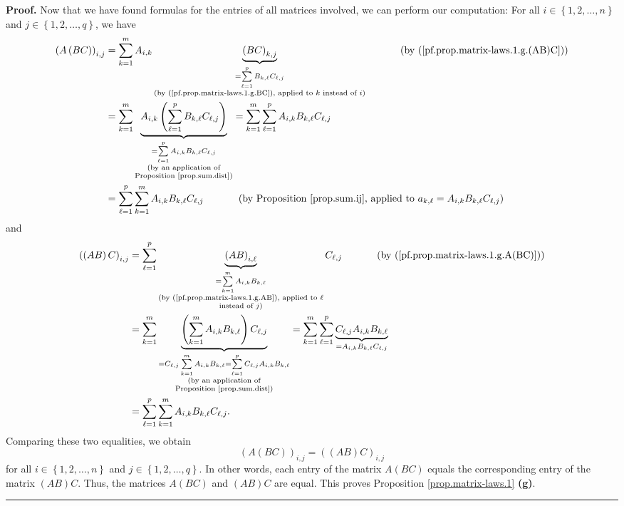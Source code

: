 \documentclass[numbers=enddot,12pt,final,onecolumn,notitlepage]{scrartcl}%
\theoremstyle{definition}
\newenvironment{proof}[1][Proof]{\noindent\textbf{#1.} }{\ \rule{0.5em}{0.5em}}
\let\sumnonlimits\sum
\renewcommand{\sum}{\sumnonlimits\limits}
\begin{document}
\begin{proof}
Now that we have found formulas for the entries of all matrices involved, we
can perform our computation: For all $i\in\left\{  1,2,\ldots,n\right\}  $ and
$j\in\left\{  1,2,\ldots,q\right\}  $, we have%
\begin{align*}
\left(  A\left(  BC\right)  \right)  _{i,j}  &  =\sum_{k=1}^{m}A_{i,k}%
\underbrace{\left(  BC\right)  _{k,j}}_{\substack{=\sum_{\ell=1}^{p}B_{k,\ell
}C_{\ell,j}\\\text{(by (\ref{pf.prop.matrix-laws.1.g.BC}), applied to }k\text{
instead of }i\text{)}}}\ \ \ \ \ \ \ \ \ \ \left(  \text{by
(\ref{pf.prop.matrix-laws.1.g.(AB)C})}\right) \\
&  =\sum_{k=1}^{m}\underbrace{A_{i,k}\left(  \sum_{\ell=1}^{p}B_{k,\ell
}C_{\ell,j}\right)  }_{\substack{=\sum_{\ell=1}^{p}A_{i,k}B_{k,\ell}C_{\ell
,j}\\\text{(by an application of}\\\text{Proposition \ref{prop.sum.dist})}%
}}=\sum_{k=1}^{m}\sum_{\ell=1}^{p}A_{i,k}B_{k,\ell}C_{\ell,j}\\
&  =\sum_{\ell=1}^{p}\sum_{k=1}^{m}A_{i,k}B_{k,\ell}C_{\ell,j}%
\ \ \ \ \ \ \ \ \ \ \left(  \text{by Proposition \ref{prop.sum.ij}, applied to
}a_{k,\ell}=A_{i,k}B_{k,\ell}C_{\ell,j}\right)
\end{align*}
and%
\begin{align*}
\left(  \left(  AB\right)  C\right)  _{i,j}  &  =\sum_{\ell=1}^{p}%
\underbrace{\left(  AB\right)  _{i,\ell}}_{\substack{=\sum_{k=1}^{m}%
A_{i,k}B_{k,\ell}\\\text{(by (\ref{pf.prop.matrix-laws.1.g.AB}), applied to
}\ell\\\text{instead of }j\text{)}}}C_{\ell,j}\ \ \ \ \ \ \ \ \ \ \left(
\text{by (\ref{pf.prop.matrix-laws.1.g.A(BC)})}\right) \\
&  =\sum_{k=1}^{m}\underbrace{\left(  \sum_{k=1}^{m}A_{i,k}B_{k,\ell}\right)
C_{\ell,j}}_{\substack{=C_{\ell,j}\sum_{k=1}^{m}A_{i,k}B_{k,\ell}=\sum
_{\ell=1}^{p}C_{\ell,j}A_{i,k}B_{k,\ell}\\\text{(by an application
of}\\\text{Proposition \ref{prop.sum.dist})}}}=\sum_{k=1}^{m}\sum_{\ell=1}%
^{p}\underbrace{C_{\ell,j}A_{i,k}B_{k,\ell}}_{=A_{i,k}B_{k,\ell}C_{\ell,j}}\\
&  =\sum_{\ell=1}^{p}\sum_{k=1}^{m}A_{i,k}B_{k,\ell}C_{\ell,j}.
\end{align*}
Comparing these two equalities, we obtain
\[
\left(  A\left(  BC\right)  \right)  _{i,j}=\left(  \left(  AB\right)
C\right)  _{i,j}%
\]
for all $i\in\left\{  1,2,\ldots,n\right\}  $ and $j\in\left\{  1,2,\ldots
,q\right\}  $. In other words, each entry of the matrix $A\left(  BC\right)  $
equals the corresponding entry of the matrix $\left(  AB\right)  C$. Thus, the
matrices $A\left(  BC\right)  $ and $\left(  AB\right)  C$ are equal. This
proves Proposition \ref{prop.matrix-laws.1} \textbf{(g)}.
\end{proof}
\end{document}
